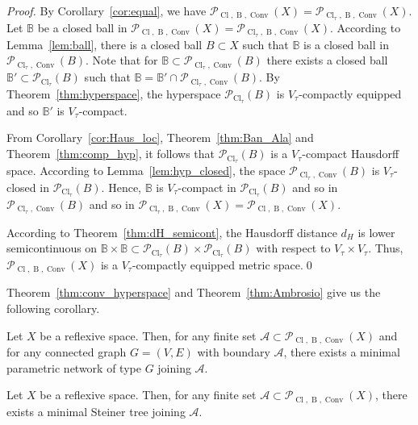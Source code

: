 \documentclass{svproc}
\def\Cl{\operatorname{Cl}}
\def\Conv{\operatorname{Conv}}
\def\B{\operatorname{B}}
\begin{document}
\begin{proof}

By Corollary~\ref{cor:equal}, we have $\mathcal{P}_{\Cl, \B, \Conv}(X) = \mathcal{P}_{\Cl_{\tau}, \B, \Conv}(X)$. Let $\mathbb{B}$ be a closed ball in $\mathcal{P}_{\Cl, \B, \Conv}(X) = \mathcal{P}_{\Cl_{\tau}, \B, \Conv}(X)$. According to Lemma~\ref{lem:ball}, there is a closed ball $B\subset X$ such that $\mathbb{B}$ is a closed ball in $\mathcal{P}_{\Cl_{\tau}, \Conv}(B)$. Note that for $\mathbb{B}\subset \mathcal{P}_{\Cl_{\tau}, \Conv}(B)$ there exists a closed ball $\mathbb{B}'\subset \mathcal{P}_{\Cl_{\tau}}(B)$ such that $\mathbb{B} = \mathbb{B}'\cap \mathcal{P}_{\Cl_{\tau}, \Conv}(B)$. By Theorem~\ref{thm:hyperspace}, the hyperspace $\mathcal{P}_{\Cl_{\tau}}(B)$ is $V_{\tau}$-compactly equipped and so $\mathbb{B}'$ is $V_{\tau}$-compact.

From Corollary~\ref{cor:Haus_loc}, Theorem~\ref{thm:Ban_Ala} and Theorem~\ref{thm:comp_hyp}, it follows that $\mathcal{P}_{\Cl_{\tau}}(B)$ is a $V_{\tau}$-compact Hausdorff space. According to Lemma~\ref{lem:hyp_closed}, the space $\mathcal{P}_{\Cl_{\tau}, \Conv}(B)$ is $V_{\tau}$-closed in $\mathcal{P}_{\Cl_{\tau}}(B)$. Hence, $\mathbb{B}$ is $V_{\tau}$-compact in $\mathcal{P}_{\Cl_{\tau}}(B)$ and so in $\mathcal{P}_{\Cl_{\tau},\Conv}(B)$ and so in $\mathcal{P}_{\Cl_{\tau}, \B, \Conv}(X) = \mathcal{P}_{\Cl, \B, \Conv}(X)$.

According to Theorem~\ref{thm:dH_semicont}, the Hausdorff distance $d_H$ is lower semicontinuous on $\mathbb{B}\times \mathbb{B}\subset \mathcal{P}_{\Cl_{\tau}}(B)\times \mathcal{P}_{\Cl_{\tau}}(B)$ with respect to $V_{\tau}\times V_{\tau}$. Thus, $\mathcal{P}_{\Cl, \B, \Conv}(X)$ is a $V_{\tau}$-compactly equipped metric space.\qed

\end{proof}

Theorem~\ref{thm:conv_hyperspace} and Theorem~\ref{thm:Ambrosio} give us the following corollary.

\begin{corollary}\label{cor:Ambrosio_ref}
Let $X$ be a reflexive space. Then, for any finite set $\mathcal{A}\subset \mathcal{P}_{\Cl, \B, \Conv}(X)$ and for any connected graph $G = (V, E)$ with boundary $\mathcal{A}$, there exists a minimal parametric network of type $G$ joining $\mathcal{A}$.
\end{corollary}

\begin{corollary}\label{cor:Ambrosio_St_ref}
Let $X$ be a reflexive space. Then, for any finite set $\mathcal{A}\subset \mathcal{P}_{\Cl, \B, \Conv}(X)$, there exists a minimal Steiner tree joining $\mathcal{A}$.
\end{corollary}
\end{document}
